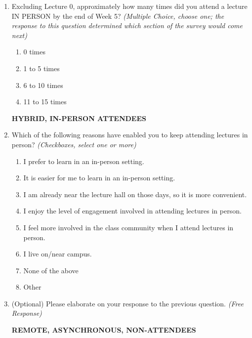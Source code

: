 \begin{enumerate}
    \item Excluding Lecture 0, approximately how many times did you attend a lecture IN PERSON by the end of Week 5? \textit{(Multiple Choice, choose one; the response to this question determined which section of the survey would come next)}
    \begin{enumerate}
        \item 0 times
        \item 1 to 5 times
        \item 6 to 10 times
        \item 11 to 15 times
    \end{enumerate}

\noindent \textbf{HYBRID, IN-PERSON ATTENDEES}

    \item Which of the following reasons have enabled you to keep attending lectures in person? \textit{(Checkboxes, select one or more)}
    \begin{enumerate}
        \item I prefer to learn in an in-person setting.
        \item It is easier for me to learn in an in-person setting.
        \item I am already near the lecture hall on those days, so it is more convenient.
        \item I enjoy the level of engagement involved in attending lectures in person.
        \item I feel more involved in the class community when I attend lectures in person.
        \item I live on/near campus.
        \item None of the above
        \item Other
    \end{enumerate}

    \item (Optional) Please elaborate on your response to the previous question. \textit{(Free Response)}

\noindent \textbf{REMOTE, ASYNCHRONOUS, NON-ATTENDEES}


\end{enumerate}
